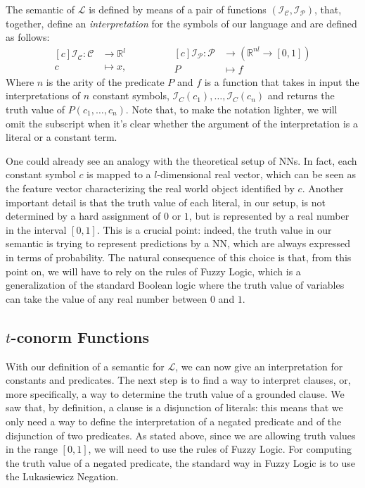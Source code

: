 \begin{definition}
	The semantic of $\mathcal{L}$ is defined by means of a pair of functions $\left( \mathcal{I}_{\mathcal{C}}, \mathcal{I}_{\mathcal{P}} \right)$, that, together, define an \textit{interpretation} for the symbols of our language and are defined as follows:
	\begin{equation}
	\begin{aligned}[c]
			\mathcal{I}_{\mathcal{C}}: \mathcal{C} &\longrightarrow \mathbb{R}^l\\
			c&\longmapsto x,
	\end{aligned}
	\qquad \qquad
	\begin{aligned}[c]
	\mathcal{I}_{\mathcal{P}}: \mathcal{P} &\longrightarrow \left( \mathbb{R}^{nl} \rightarrow \left[0,1\right] \right)\\
	P &\longmapsto f
	\end{aligned}
	\end{equation}	
	Where $n$ is the arity of the predicate $P$ and $f$ is a function that takes in input the interpretations of $n$ constant symbols, $\mathcal{I}_C(c_1), \dots, \mathcal{I}_C(c_n)$ and returns the truth value of $P(c_1,\dots,c_n)$. Note that, to make the notation lighter, we will omit the subscript when it's clear whether the argument of the interpretation is a literal or a constant term.
\end{definition}

One could already see an analogy with the theoretical setup of NNs. In fact, each constant symbol $c$ is mapped to a $l$-dimensional real vector, which can be seen as the feature vector characterizing the real world object identified by $c$. Another important detail is that the truth value of each literal, in our setup, is not determined by a hard assignment of $0$ or $1$, but is represented by a real number in the interval $\left[ 0,1 \right]$. This is a crucial point: indeed, the truth value in our semantic is trying to represent predictions by a NN, which are always expressed in terms of probability. The natural consequence of this choice is that, from this point on, we will have to rely on the rules of Fuzzy Logic, which is a generalization of the standard Boolean logic where the truth value of variables can take the value of any real number between $0$ and $1$. 

\subsection{$t$-conorm Functions}
With our definition of a semantic for $\mathcal{L}$, we can now give an interpretation for constants and predicates. The next step is to find a way to interpret clauses, or, more specifically, a way to determine the truth value of a grounded clause. We saw that, by definition, a clause is a disjunction of literals: this means that we only need a way to define the interpretation of a negated predicate and of the disjunction of two predicates. As stated above, since we are allowing truth values in the range $\left[ 0,1\right]$, we will need to use the rules of Fuzzy Logic. For computing the truth value of a negated predicate, the standard way in Fuzzy Logic is to use the Lukasiewicz Negation.


